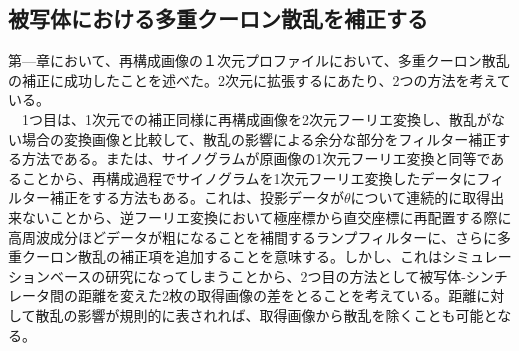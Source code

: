 \subsection{被写体における多重クーロン散乱を補正する}
第---章において、再構成画像の１次元プロファイルにおいて、多重クーロン散乱の補正に成功したことを述べた。2次元に拡張するにあたり、2つの方法を考えている。\\
　1つ目は、1次元での補正同様に再構成画像を2次元フーリエ変換し、散乱がない場合の変換画像と比較して、散乱の影響による余分な部分をフィルター補正する方法である。または、サイノグラムが原画像の1次元フーリエ変換と同等であることから、再構成過程でサイノグラムを1次元フーリエ変換したデータにフィルター補正をする方法もある。これは、投影データが$\theta$について連続的に取得出来ないことから、逆フーリエ変換において極座標から直交座標に再配置する際に高周波成分ほどデータが粗になることを補間するランプフィルターに、さらに多重クーロン散乱の補正項を追加することを意味する。しかし、これはシミュレーションベースの研究になってしまうことから、2つ目の方法として被写体-シンチレータ間の距離を変えた2枚の取得画像の差をとることを考えている。距離に対して散乱の影響が規則的に表されれば、取得画像から散乱を除くことも可能となる。

%